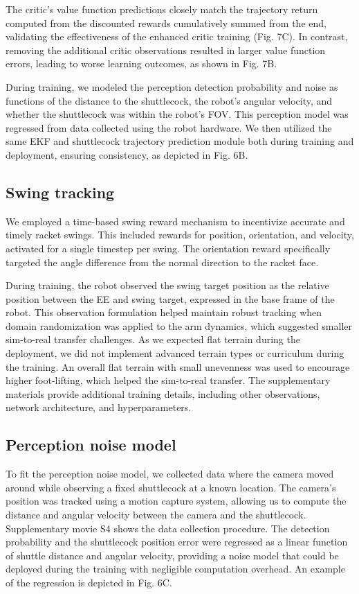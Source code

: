 \documentclass[9pt,twocolumn,twoside]{osajnl}
\begin{document}
The critic's value function predictions closely match the trajectory return computed from the discounted rewards cumulatively summed from the end, validating the effectiveness of the enhanced critic training (Fig. 7C). In contrast, removing the additional critic observations resulted in larger value function errors, leading to worse learning outcomes, as shown in Fig. 7B.

During training, we modeled the perception detection probability and noise as functions of the distance to the shuttlecock, the robot's angular velocity, and whether the shuttlecock was within the robot's FOV. This perception model was regressed from data collected using the robot hardware. We then utilized the same \ac{EKF} and shuttlecock trajectory prediction module both during training and deployment, ensuring consistency, as depicted in Fig. 6B.

\subsection*{Swing tracking}
We employed a time-based swing reward mechanism to incentivize accurate and timely racket swings. This included rewards for position, orientation, and velocity, activated for a single timestep per swing. The orientation reward specifically targeted the angle difference from the normal direction to the racket face.

During training, the robot observed the swing target position as the relative position between the \ac{EE} and swing target, expressed in the base frame of the robot. This observation formulation helped maintain robust tracking when domain randomization was applied to the arm dynamics, which suggested smaller sim-to-real transfer challenges. As we expected flat terrain during the deployment, we did not implement advanced terrain types or curriculum during the training. An overall flat terrain with small unevenness was used to encourage higher foot-lifting, which helped the sim-to-real transfer. The supplementary materials provide additional training details, including other observations, network architecture, and hyperparameters.

\subsection*{Perception noise model}
To fit the perception noise model, we collected data where the camera moved around while observing a fixed shuttlecock at a known location. The camera's position was tracked using a motion capture system, allowing us to compute the distance and angular velocity between the camera and the shuttlecock. Supplementary movie S4 shows the data collection procedure. The detection probability and the shuttlecock position error were regressed as a linear function of shuttle distance and angular velocity, providing a noise model that could be deployed during the training with negligible computation overhead. An example of the regression is depicted in Fig. 6C. 
\end{document}
